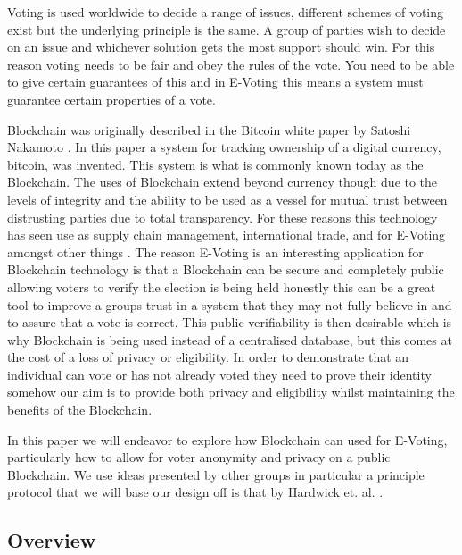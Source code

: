 \documentclass{entcs}
\begin{document}
Voting is used worldwide to decide a range of issues, different schemes of voting exist but the underlying principle is the same. A group of parties wish to decide on an issue and whichever solution gets the most support should win. For this reason voting needs to be fair and obey the rules of the vote. You need to be able to give certain guarantees of this and in E-Voting this means a system must guarantee certain properties of a vote.

Blockchain was originally described in the Bitcoin white paper by Satoshi Nakamoto \cite{BTCWhitepaper}. In this paper a system for tracking ownership of a digital currency, bitcoin, was invented. This system is what is commonly known today as the Blockchain. The uses of Blockchain extend beyond currency though due to the levels of integrity and the ability to be used as a vessel for mutual trust between distrusting parties due to total transparency. For these reasons this technology has seen use as supply chain management, international trade, and for E-Voting amongst other things \cite{wust2018need}. The reason E-Voting is an interesting application for Blockchain technology is that a Blockchain can be secure and completely public allowing voters to verify the election is being held honestly this can be a great tool to improve a groups trust in a system that they may not fully believe in and to assure that a vote is correct. This public verifiability is then desirable which is why Blockchain is being used instead of a centralised database, but this comes at the cost of a loss of privacy or eligibility. In order to demonstrate that an individual can vote or has not already voted they need to prove their identity somehow our aim is to provide both privacy and eligibility whilst maintaining the benefits of the Blockchain.

In this paper we will endeavor to explore how Blockchain can used for E-Voting, particularly how to allow for voter anonymity and privacy on a public Blockchain. We use ideas presented by other groups in particular a principle protocol that we will base our design off is that by Hardwick et. al. \cite{hardwick2018}.

\subsection{Overview}
\end{document}
